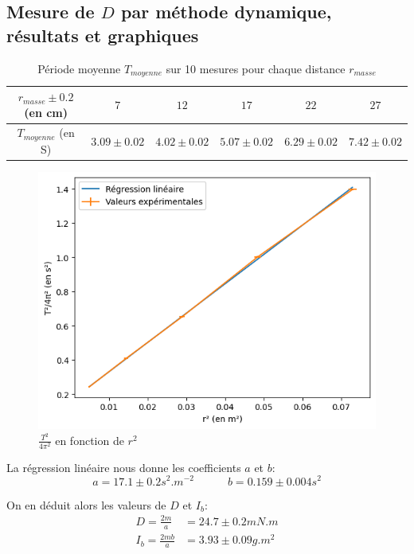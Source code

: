 \documentclass[12pt]{article}
\begin{document}
\subsection{Mesure de $D$ par méthode dynamique, résultats et graphiques}
\label{section:D_dynamique}
\begin{table}[h!]
	\centering
	\begin{tabular}{||c | c c c c c||} 
		\hline
		$r_{masse} \pm 0.2$ (en cm) & $7$ & $12$ & $17$ & $22$ & $27$ \\
		\hline
        $T_{moyenne}$ (en S) & $3.09 \pm 0.02$ & $4.02 \pm 0.02$ & $5.07 \pm 0.02$ & $6.29 \pm 0.02$ & $7.42 \pm 0.02$\\
        \hline
    \end{tabular}
	\caption{Période moyenne $T_{moyenne}$ sur 10 mesures pour chaque distance $r_{masse}$}
	\label{table:mesure_D_dynamique}
\end{table}
\begin{figure}[h!]
    \begin{center}
        \includegraphics*[scale=1]{img/D_dynamique.png}
    \end{center}
    \caption{$\frac{T^2}{4\pi^2}$ en fonction de $r^2$}
    \label{fig:graphe_T}
\end{figure}

La régression linéaire nous donne les coefficients $a$ et $b$:
\begin{equation}
    a = 17.1 \pm 0.2 s^2.m^{-2} \quad \quad \quad b = 0.159 \pm 0.004 s^2
\end{equation}

On en déduit alors les valeurs de $D$ et $I_b$:
\begin{align*}
    D = \frac{2m}{a} & = 24.7 \pm 0.2 mN.m \\
    I_b = \frac{2mb}{a} & = 3.93 \pm 0.09 g.m^2 %
\end{align*}
\end{document}
